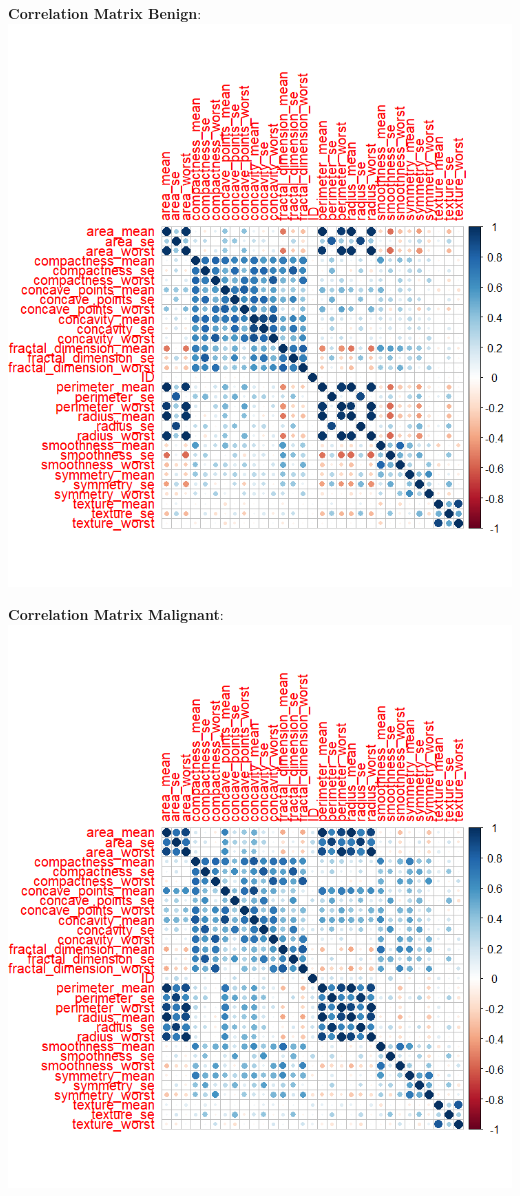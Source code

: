 \documentclass[
]{article}
\begin{document}
\textbf{Correlation Matrix Benign}:
\includegraphics{images/correlation_matrix_benign.png}

\textbf{Correlation Matrix Malignant}:
\includegraphics{images/correlation_matrix_malignant.png}
\end{document}
